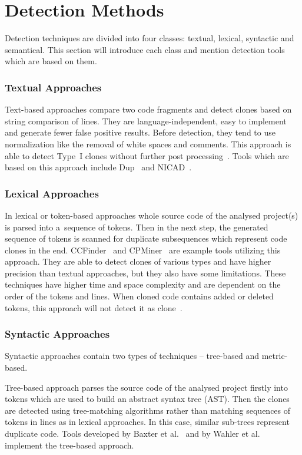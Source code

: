 \section{Detection Methods}
  Detection techniques are divided into four classes: textual, lexical, syntactic and semantical.
  This section will introduce each class and mention detection tools which are based on them.

  \subsubsection*{Textual Approaches}\label{clone-detection:simian}
    Text-based approaches compare two code fragments and detect clones based on string comparison of lines.
    They are language-independent, easy to implement and generate fewer false positive results. Before detection,
    they tend to use normalization like the removal of white spaces and comments. This approach is able to detect
    Type~I clones without further post processing~\cite{CloneDetectionTechniques, CodeClonesSurvey}. Tools which
    are based on this approach include Dup~\cite{Dup} and NICAD~\cite{NICAD}.

  \subsubsection*{Lexical Approaches}
    In lexical or token-based approaches whole source code of the analysed project(s) is parsed into a~sequence
    of tokens. Then in the next step, the generated sequence of tokens is scanned for duplicate subsequences which
    represent code clones in the end. CCFinder~\cite{CCFinder} and CPMiner~\cite{CPMiner} are example tools
    utilizing this approach. They are able to detect clones of various types and have higher precision than
    textual approaches, but they also have some limitations. These techniques have higher time and space
    complexity and are dependent on the order of the tokens and lines. When cloned code contains added or deleted
    tokens, this approach will not detect it as clone~\cite{CloneDetectionTechniques, CodeClonesSurvey}.

  \subsubsection*{Syntactic Approaches}
    Syntactic approaches contain two types of techniques -- tree-based and metric-based.

    Tree-based approach parses the source code of the analysed project firstly into tokens which are used
    to build an abstract syntax tree (AST). Then the clones are detected using tree-matching algorithms rather
    than matching sequences of tokens in lines as in lexical approaches. In this case, similar sub-trees
    represent duplicate code. Tools developed by Baxter et al.~\cite{ASTBaxter} and by Wahler et
    al.~\cite{ASTWahler} implement the tree-based approach.

